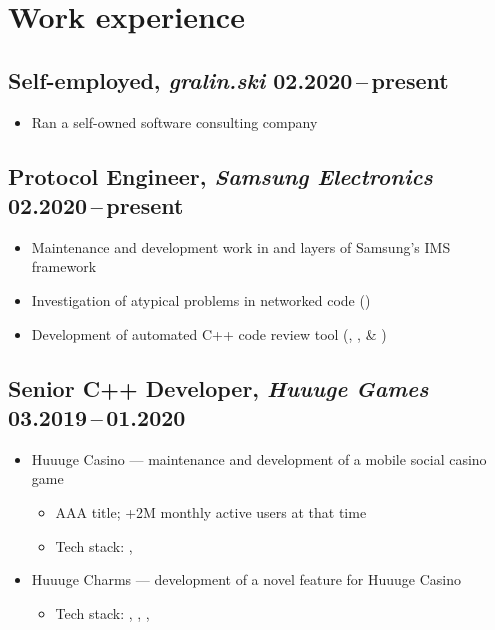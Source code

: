 \documentclass[a4paper,10pt]{article}
\begin{document}
\section{Work experience}
\subsection{Self-employed, \textit{gralin.ski} \hfill 02.2020\,--\,present}
\begin{itemize}[leftmargin=15pt,itemsep=3pt]
  \item Ran a self-owned software consulting company
\end{itemize}

\vspace{18pt}
\subsection{Protocol Engineer, \textit{Samsung Electronics} \hfill 02.2020\,--\,present}
\begin{itemize}[leftmargin=15pt,itemsep=3pt]
  \item Maintenance and development work in  and  layers of Samsung's IMS framework
  \item Investigation of atypical problems in networked code ()
  \item Development of automated C++ code review tool (, ,
       \& )
\end{itemize}

\vspace{18pt}
\subsection{Senior C++ Developer, \textit{Huuuge Games} \hfill 03.2019\,--\,01.2020}
\begin{itemize}[leftmargin=15pt,itemsep=3pt]
  \item Huuuge Casino --- maintenance and development of a mobile social casino game
  \begin{itemize}
    \item AAA title; +2M monthly active users at that time
    \item Tech stack: , 
  \end{itemize}
  \item Huuuge Charms --- development of a novel feature for Huuuge Casino
  \begin{itemize}
    \item Tech stack: , , , 
  \end{itemize}
\end{itemize}
\end{document}
